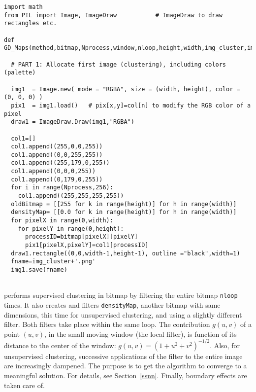 \documentclass[10pt]{article}
\begin{document}
\begin{lstlisting}
import math
from PIL import Image, ImageDraw           # ImageDraw to draw rectangles etc.

def GD_Maps(method,bitmap,Nprocess,window,nloop,height,width,img_cluster,img_density):

  # PART 1: Allocate first image (clustering), including colors (palette)

  img1  = Image.new( mode = "RGBA", size = (width, height), color = (0, 0, 0) )
  pix1  = img1.load()   # pix[x,y]=col[n] to modify the RGB color of a pixel
  draw1 = ImageDraw.Draw(img1,"RGBA")

  col1=[] 
  col1.append((255,0,0,255))
  col1.append((0,0,255,255))
  col1.append((255,179,0,255))
  col1.append((0,0,0,255))
  col1.append((0,179,0,255))
  for i in range(Nprocess,256):
    col1.append((255,255,255,255))
  oldBitmap = [[255 for k in range(height)] for h in range(width)]
  densityMap= [[0.0 for k in range(height)] for h in range(width)]
  for pixelX in range(0,width): 
    for pixelY in range(0,height): 
      processID=bitmap[pixelX][pixelY]
      pix1[pixelX,pixelY]=col1[processID] 
  draw1.rectangle((0,0,width-1,height-1), outline ="black",width=1)
  fname=img_cluster+'.png'
  img1.save(fname)
\end{lstlisting}
\quad \\
 performs supervised clustering in bitmap by filtering the entire bitmap \texttt{nloop} times. It also creates and filters
\texttt{densityMap}, another bitmap with same dimensions, this time for unsupervised clustering, and using a slightly different filter. Both filters take place within the same loop.
The contribution $g(u,v)$ of a point $(u, v)$, in the small moving window (the local filter), is function of its distance to the center of the
window: $g(u,v)=(1+u^2+v^2)^{-1/2}$. Also, for unsupervised clustering, successive applications of the filter to the entire image are increasingly dampened. The purpose is to get the algorithm to converge to a meaningful solution. For details, see Section~\ref{ssnn}.
Finally, boundary effects are taken care of.
\end{document}
